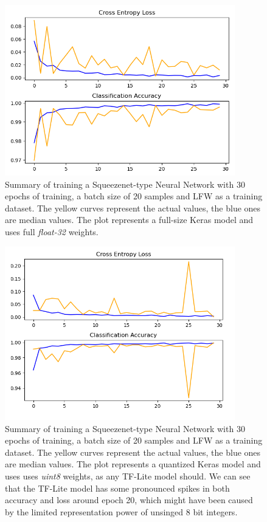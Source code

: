 \begin{figure}
    \centering
    \includegraphics[width = 10cm]{images/squeezenet_30ep_10bat_lfw_full.png}
    \caption{Summary of training a Squeezenet-type Neural Network with 30 epochs of training, a batch size of 20 samples and LFW as a training dataset. The yellow curves represent the actual values, the blue ones are median values. The plot represents a full-size Keras model and uses full \textit{float-32} weights.}
    \label{fig:squeezenet_30ep_10bat_lfw_full}
\end{figure}

\begin{figure}
    \centering
    \includegraphics[width = 10cm]{images/squeezenet_30ep_10bat_lfw_tfl.png}
    \caption{Summary of training a Squeezenet-type Neural Network with 30 epochs of training, a batch size of 20 samples and LFW as a training dataset. The yellow curves represent the actual values, the blue ones are median values. The plot represents a quantized Keras model and uses uses \textit{uint8} weights, as any TF-Lite model should. We can see that the TF-Lite model has some pronounced spikes in both accuracy and loss around epoch 20, which might have been caused by the limited representation power of unsinged 8 bit integers.}
    \label{fig:squeezenet_30ep_10bat_lfw_tfl}
\end{figure}